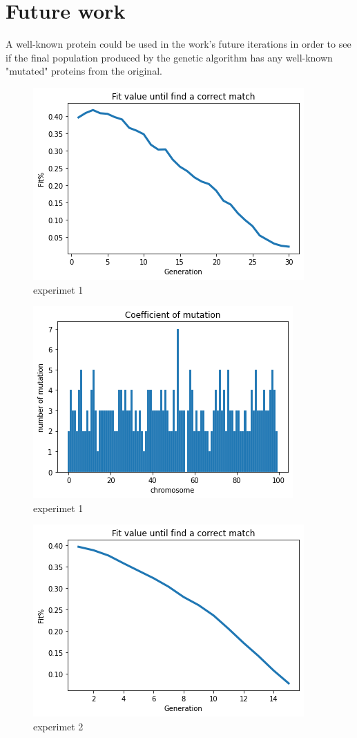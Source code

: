 \documentclass[letterpaper]{article} %
\begin{document}
\section{Future work}
A well-known protein could be used in the work's future iterations in order to see if the final population produced by the genetic algorithm has any well-known "mutated" proteins from the original.

\begin{figure}[h]
\centering
    \includegraphics[scale = 0.5]{fitpop100.png}
    \caption{experimet 1}
\end{figure}
\begin{figure}[h]
 \centering
 \includegraphics[scale = 0.5]{histpop100.png}
    \caption{experimet 1}
\end{figure}
\begin{figure}[h]
\centering
    \includegraphics[scale = 0.5]{fitpop1000.png}
    \caption{experimet 2}
\end{figure}
\end{document}
